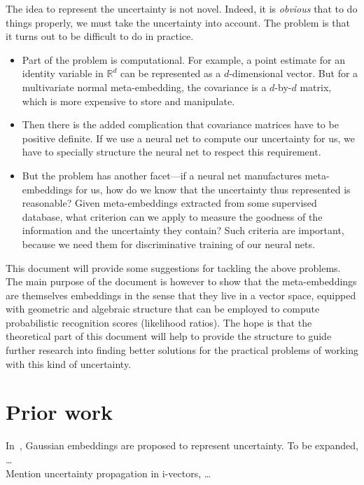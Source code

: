\documentclass[a4paper,oneside,12pt,english]{report}
\def\R{\mathbb{R}}
\begin{document}
The idea to represent the uncertainty is not novel. Indeed, it is \emph{obvious} that to do things properly, we must take the uncertainty into account. The problem is that it turns out to be difficult to do in practice. 
\begin{itemize}
	\item Part of the problem is computational. For example, a point estimate for an identity variable in $\R^d$ can be represented as a $d$-dimensional vector. But for a multivariate normal meta-embedding, the covariance is a $d$-by-$d$ matrix, which is more expensive to store and manipulate. 
	\item Then there is the added complication that covariance matrices have to be positive definite. If we use a neural net to compute our uncertainty for us, we have to specially structure the neural net to respect this requirement. 
	\item But the problem has another facet---if a neural net manufactures meta-embeddings for us, how do we know that the uncertainty thus represented is reasonable? Given meta-embeddings extracted from some supervised database, what criterion can we apply to measure the goodness of the information and the uncertainty they contain? Such criteria are important, because we need them for discriminative training of our neural nets.
\end{itemize}
This document will provide some suggestions for tackling the above problems.\\ 

\noindent The main purpose of the document is however to show that the meta-embeddings are themselves embeddings in the sense that they live in a vector space, equipped with geometric and algebraic structure that can be employed to compute probabilistic recognition scores (likelihood ratios). The hope is that the theoretical part of this document will help to provide the structure to guide further research into finding better solutions for the practical problems of working with this kind of uncertainty.    



\section{Prior work}
In~\cite{Vilnis}, Gaussian embeddings are proposed to represent uncertainty. To be expanded, \ldots\\

\noindent Mention uncertainty propagation in i-vectors\cite{Uncertainty-Sandro, Uncertainty-Patrick, Uncertainty-Themos, Uncertainty-Bilbao}, \ldots 
\end{document}
